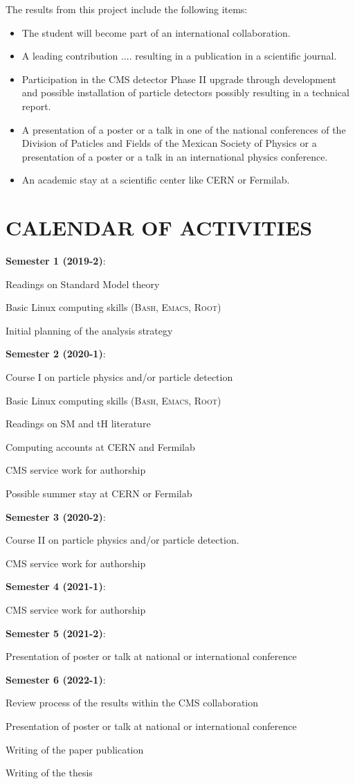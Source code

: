 \documentclass[final,3p]{CSP}
\newcommand{\SubItem}[1]{
    {\setlength\itemindent{15pt} \item[-] #1}
}
\begin{document}
\onehalfspacing The results from this project include the following items:
\begin{itemize}
\item The student will become part of an international collaboration.
\item A leading contribution ....  resulting in a publication in a scientific journal.
\item Participation in the CMS detector Phase II upgrade through development and possible installation of particle detectors possibly resulting in a technical report.
\item A presentation of a poster or a talk in one of the national conferences of the Division of Paticles and Fields of the Mexican Society of Physics or a presentation of a poster or a talk in an international physics conference.
\item An academic stay at a scientific center like CERN or Fermilab.
\end{itemize}



\section{CALENDAR OF ACTIVITIES}
\onehalfspacing
\begin{itemize}

\item {\bf Semester 1 (2019-2)}:
  \SubItem{ Readings on Standard Model theory}
  \SubItem{ Basic Linux computing skills (\textsc{Bash, Emacs, Root})}
  \SubItem{ Initial planning of the analysis strategy}

\item {\bf Semester 2 (2020-1)}:
  \SubItem{ Course I on particle physics and/or particle detection}
  \SubItem{ Basic Linux computing skills (\textsc{Bash, Emacs, Root})}
  \SubItem{ Readings on SM and tH literature}
  \SubItem{ Computing accounts at CERN and Fermilab}
  \SubItem{ CMS service work for authorship}
  \SubItem{ Possible summer stay at CERN or Fermilab}

\item {\bf Semester 3 (2020-2)}:
  \SubItem{ Course II on particle physics and/or particle detection.}
  \SubItem{ CMS service work for authorship}

\item {\bf Semester 4 (2021-1)}:
  \SubItem{ CMS service work for authorship}

\item {\bf Semester 5 (2021-2)}:
  \SubItem{ Presentation of poster or talk at national or international conference}

\item {\bf Semester 6 (2022-1)}:
  \SubItem{ Review process of the results within the CMS collaboration}
  \SubItem{ Presentation of poster or talk at national or international conference}
  \SubItem{ Writing of the paper publication}
  \SubItem{ Writing of the thesis}
\end{itemize}



\cleardoublepage
\onehalfspacing


\end{document}
